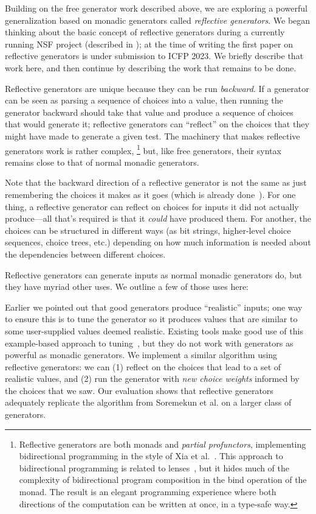 Building on the free generator work described above, we are exploring a powerful
generalization based on monadic generators called {\em reflective generators}.
We began thinking about the basic concept of reflective generators during a
currently running NSF project (described in ); at the time
of writing the first paper on reflective generators is under submission to ICFP
2023.  We briefly describe that work here, and then continue by describing the
work that remains to be done.

Reflective generators are unique because they can be run {\em backward}.
If a generator can be seen as parsing a sequence of choices into a
value, then running the
generator backward should take that value and produce a sequence of choices that
would generate it; reflective generators can
``reflect'' on the choices that they might have made to generate a
given test. The machinery
that makes reflective generators work is rather complex,%
\footnote{\normalsize Reflective generators are both monads and {\em
    partial profunctors},
implementing bidirectional programming in the style of Xia et
al.~\cite{xia2019composing}. This approach to bidirectional programming is
related to lenses~\cite{foster2009bidirectional}, but it hides much of the
complexity of bidirectional program composition in the bind operation of the
monad. The result is an elegant programming experience where both directions of
the computation can be written at once, in a type-safe way.}
but, like free generators, their syntax remains close to that of normal
monadic generators.

Note that the backward direction of a reflective generator is not the
same as just remembering the choices it makes as it goes (which is
already done~\cite{maciver2019hypothesis,
  hatfield-dodds_hypofuzz_nodate}). For one thing, a reflective
generator can reflect on choices for inputs it did not actually
produce---all that's required is that it {\em could} have produced
them.  For another, the choices can be structured in different ways (as bit
strings, higher-level choice sequences, choice trees, etc.) depending
on how much information is needed about the dependencies between different
choices.

Reflective generators can generate inputs as normal monadic generators do,
but they have myriad other uses. We outline a few of those uses here:

 Earlier we pointed out that good generators
produce ``realistic'' inputs; one way to ensure this is to tune the generator so
it produces values that are similar to some user-supplied values deemed
realistic. Existing tools make good use of this example-based approach to
tuning~\cite{soremekun2020inputs}, but they do not work with generators as
powerful as monadic generators. We implement a similar algorithm using
reflective generators: we can (1) reflect on the choices that lead to a
set of realistic values, and (2) run the generator with {\em new choice weights}
informed by the choices that we saw. Our evaluation shows that reflective
generators adequately replicate the algorithm from
Soremekun et al. on a larger class of generators.

